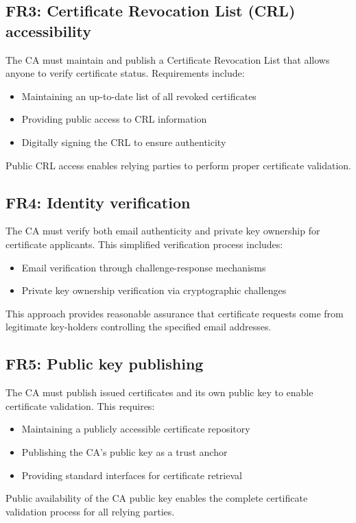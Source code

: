 \subsection{FR3: Certificate Revocation List (CRL) accessibility}

The CA must maintain and publish a Certificate Revocation List that allows 
anyone to verify certificate status. Requirements include:

\begin{itemize}
    \item Maintaining an up-to-date list of all revoked certificates
    \item Providing public access to CRL information
    \item Digitally signing the CRL to ensure authenticity
\end{itemize}
Public CRL access enables relying parties to perform proper certificate validation.

\subsection{FR4: Identity verification}

The CA must verify both email authenticity and private key ownership for 
certificate applicants. This simplified verification process includes:

\begin{itemize}
    \item Email verification through challenge-response mechanisms
    \item Private key ownership verification via cryptographic challenges
\end{itemize}
This approach provides reasonable assurance that certificate requests come 
from legitimate key-holders controlling the specified email addresses.

\subsection{FR5: Public key publishing}

The CA must publish issued certificates and its own public key to enable 
certificate validation. This requires:

\begin{itemize}
    \item Maintaining a publicly accessible certificate repository
    \item Publishing the CA's public key as a trust anchor
    \item Providing standard interfaces for certificate retrieval
\end{itemize}
Public availability of the CA public key enables the complete 
certificate validation process for all relying parties.

